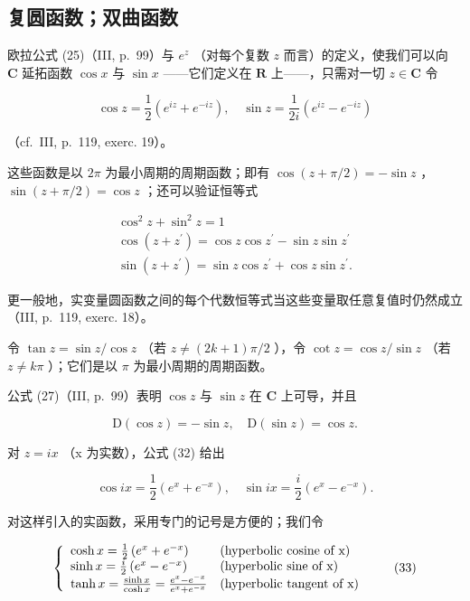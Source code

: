 \subsection{复圆函数；双曲函数}

欧拉公式 (25)（III, p.~99）与 \(e^z\) （对每个复数 \(z\) 而言）的定义，使我们可以向 \(\mathbf{C}\) 延拓函数 \(\cos x\) 与 \(\sin x\) ——它们定义在 \(\mathbf{R}\) 上——，只需对一切 \(z \in \mathbf{C}\) 令

\[
\cos z = \frac {1}{2} \left(e ^ {i z} + e ^ {- i z}\right), \quad \sin z = \frac {1}{2 i} \left(e ^ {i z} - e ^ {- i z}\right)\tag{32}
\]

（cf.~III, p.~119, exerc. 19）。

这些函数是以 \(2\pi\) 为最小周期的周期函数；即有 \(\cos(z + \pi/2) = -\sin z\) ，\(\sin(z + \pi/2) = \cos z\) ；还可以验证恒等式

\[
\begin{array}{c} \cos^ {2} z + \sin^ {2} z = 1 \\ \cos (z + z ^ {\prime}) = \cos z \cos z ^ {\prime} - \sin z \sin z ^ {\prime} \\ \sin (z + z ^ {\prime}) = \sin z \cos z ^ {\prime} + \cos z \sin z ^ {\prime}. \end{array}
\]

更一般地，实变量圆函数之间的每个代数恒等式当这些变量取任意复值时仍然成立（III, p.~119, exerc. 18）。

令 \(\tan z = \sin z/\cos z\) （若 \(z \neq (2k + 1)\pi/2\) ），令 \(\cot z = \cos z/\sin z\) （若 \(z \neq k\pi\) ）；它们是以 \(\pi\) 为最小周期的周期函数。

公式 (27)（III, p.~99）表明 \(\cos z\) 与 \(\sin z\) 在 \(\mathbf{C}\) 上可导，并且

\[
\mathrm{D} (\cos z) = - \sin z, \quad \mathrm{D} (\sin z) = \cos z.
\]

对 \(z = ix\) （x 为实数），公式 (32) 给出

\[
\cos i x = \frac {1}{2} \left(e ^ {x} + e ^ {- x}\right), \quad \sin i x = \frac {i}{2} \left(e ^ {x} - e ^ {- x}\right).
\]

对这样引入的实函数，采用专门的记号是方便的；我们令

\[
\left\{ \begin{array}{l l} \cosh x = \frac {1}{2} \left(e ^ {x} + e ^ {- x}\right) & \text {(hyperbolic cosine of x)} \\ \sinh x = \frac {i}{2} \left(e ^ {x} - e ^ {- x}\right) & \text {(hyperbolic sine of x)} \\ \tanh x = \frac {\sinh x}{\cosh x} = \frac {e ^ {x} - e ^ {- x}}{e ^ {x} + e ^ {- x}} & \text {(hyperbolic tangent of x)} \end{array} \right.\tag{33}
\]

